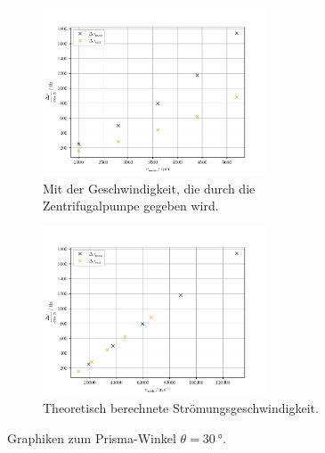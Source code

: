 \begin{figure}
    \centering
    \begin{subfigure}{0.48\textwidth}
        \centering
        \includegraphics[height=5.0cm]{plots/30_2.pdf}
        \caption{Mit der Geschwindigkeit, die durch die Zentrifugalpumpe gegeben wird.}
        \label{fig:exp30}
    \end{subfigure}
    \begin{subfigure}{0.48\textwidth}
        \centering
        \includegraphics[height=5.0cm]{plots/30_1.pdf}
        \caption{Theoretisch berechnete Strömungsgeschwindigkeit.}
        \label{fig:theo30}
    \end{subfigure}
    \caption{Graphiken zum Prisma-Winkel $\theta=\SI{30}{\degree}$.}
    \label{fig:30}
\end{figure}
